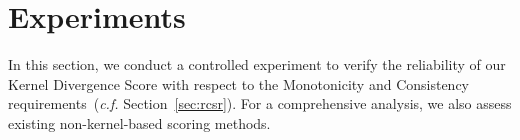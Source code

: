 
\section{Experiments}
\label{sec:experiments}
In this section, we conduct a controlled experiment to verify the reliability of our Kernel Divergence Score with respect to the Monotonicity and Consistency requirements~(\emph{c.f.} Section~\ref{sec:rcsr}). 
% 
For a comprehensive analysis, we also assess existing non-kernel-based scoring methods.



